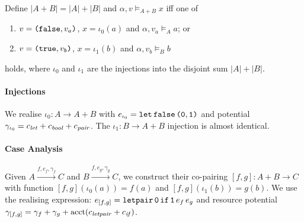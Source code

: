 \documentclass{workingnote}
\newcommand{\account}{\mathrm{acct}}
\begin{document}
Define $|A + B| = |A| + |B|$ and $\alpha, v \models_{A + B} x$ iff one of
\begin{enumerate}
\item $v = \texttt{(}\texttt{false},v_a\texttt{)}$, $x = \iota_0(a)$ and
  $\alpha, v_a \models_A a$; or
\item $v = \texttt{(}\texttt{true},v_b\texttt{)}$, $x = \iota_1(b)$ and
  $\alpha, v_b \models_B b$
\end{enumerate}
holds, where $\iota_0$ and $\iota_1$ are the injections into the
disjoint sum $|A| + |B|$.

\paragraph{Injections} We realise $\iota_0 : A \to A+B$ with
$e_{\iota_0} = \texttt{let}\,\texttt{false}\,\texttt{(}\texttt{0},\texttt{1}\texttt{)}$ and potential
$\gamma_{\iota_0} = c_{\mathit{let}} + c_{\mathit{bool}} + c_{\mathit{pair}}$. The
$\iota_1 : B \to A+B$ injection is almost identical.

\paragraph{Case Analysis} Given
$A \stackrel{f,e_f,\gamma_f}\longrightarrow C$ and
$B \stackrel{f,e_g,\gamma_g}\longrightarrow C$, we construct their
co-pairing $[f,g] : A+B \to C$ with function
$[f,g](\iota_0(a)) = f(a)$ and $[f,g](\iota_1(b)) = g(b)$. We use the
realising expression:
$e_{[f,g]} = \texttt{letpair}\,\texttt{0}\,\texttt{if}\,\texttt{1}\,e_f\,e_g$ and resource
potential
$\gamma_{[f,g]} = \gamma_f + \gamma_g + \account(\cnstLetPair +
\cnstIf)$.
\end{document}
